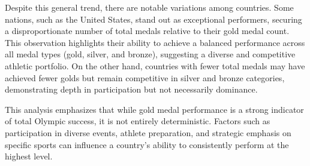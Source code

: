 \documentclass[
]{article}
\begin{document}
Despite this general trend, there are notable variations among
countries. Some nations, such as the United States, stand out as
exceptional performers, securing a disproportionate number of total
medals relative to their gold medal count. This observation highlights
their ability to achieve a balanced performance across all medal types
(gold, silver, and bronze), suggesting a diverse and competitive
athletic portfolio. On the other hand, countries with fewer total medals
may have achieved fewer golds but remain competitive in silver and
bronze categories, demonstrating depth in participation but not
necessarily dominance.

This analysis emphasizes that while gold medal performance is a strong
indicator of total Olympic success, it is not entirely deterministic.
Factors such as participation in diverse events, athlete preparation,
and strategic emphasis on specific sports can influence a country's
ability to consistently perform at the highest level.
\end{document}
